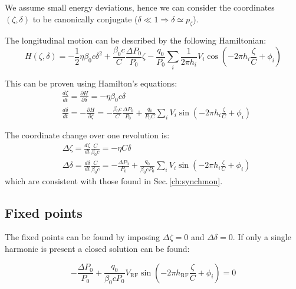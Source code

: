 We assume small energy deviations, hence we can consider the coordinates $(\zeta, \delta)$ to be canonically conjugate ($\delta \ll 1 \Rightarrow \delta \simeq p_\zeta$).

The longitudinal motion can be described by the following Hamiltonian:
\begin{equation}
H(\zeta, \delta) = -\frac{1}{2} \eta \beta_0 c \delta^2
                   + \frac{\beta_0 c}{C}\frac{\Delta P_0}{P_0} \zeta
                   - \frac{q_0}{P_0}\sum_i \frac{1}{2\pi h_i}V_i \cos\left(
                   		-2 \pi h_i \frac{\zeta}{C} + \phi_i \right)
\end{equation}

This can be proven using Hamilton's equations:
\begin{align}
&\frac{d\zeta}{dt} = \frac{\partial H}{\partial \delta} = -\eta \beta_0 c \delta\\
&\frac{d\delta}{dt} = -\frac{\partial H}{\partial \zeta} = 
	- \frac{\beta_0 c}{C}\frac{\Delta P_0}{P_0}
                   + \frac{q_0}{P_0 C} \sum_i 
                   V_i \sin\left(
                   	-2 \pi h_i \frac{\zeta}{C} + \phi_i \right)
\end{align}

The coordinate change over one revolution is:
\begin{align}
&\Delta \zeta = \frac{d\zeta}{dt}\frac{C}{\beta_0 c} 
	= -\eta C \delta\\
&\Delta \delta =\frac{d\delta}{dt} \frac{C}{\beta_0 c}= 
	- \frac{\Delta P_0}{P_0}
                   + \frac{q_0}{\beta_0 c P_0} \sum_i 
                   V_i \sin\left(
                   	-2 \pi h_i \frac{\zeta}{C} + \phi_i \right)
\end{align}
which are consistent with those found in Sec.\,\ref{ch:synchmon}.

\subsection{Fixed points}

The fixed points can be found by imposing $\Delta\zeta = 0$ and $\Delta\delta = 0$.
If only a single harmonic is present a closed solution can be found:

\begin{equation}
- \frac{\Delta P_0}{P_0}
+ \frac{q_0}{\beta_0 c P_0} 
V_\text{RF} \sin\left(
-2 \pi h_\text{RF} \frac{\zeta}{C} + \phi_i \right) = 0
\end{equation}

